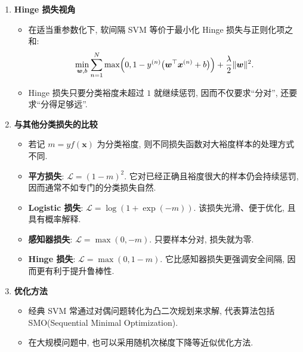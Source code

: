 \documentclass{../nndlcourse}
\begin{document}
\begin{enumerate}
\begin{itemize}
\begin{equation*}
\begin{array}{ll}
                \min_{\boldsymbol{w}, b, \boldsymbol{\xi}} & \frac{1}{2}\|\boldsymbol{w}\|^2 + C \sum_{n=1}^N \xi_n \\
                \text{s.t.} & y^{(n)}\bigl(\boldsymbol{w}^\top \boldsymbol{x}^{(n)} + b\bigr) \ge 1 - \xi_n, \quad n = 1, \dots, N, \\
                & \xi_n \ge 0, \quad n = 1, \dots, N.
            \end{array}
        \end{equation*}
        \item 当 $0 < \xi_n < 1$ 时, 样本虽然仍被分对, 但已经落入间隔内部; 当 $\xi_n \ge 1$ 时, 样本可能被错分.
        \item 超参数 $C > 0$ 用于平衡“最大化间隔”和“惩罚违约”这两个目标: $C$ 越大, 对违约样本惩罚越强; $C$ 越小, 模型越强调间隔和鲁棒性.
    \end{itemize}
    \item \textbf{Hinge 损失视角}
    \begin{itemize}
        \item 在适当重参数化下, 软间隔 SVM 等价于最小化 Hinge 损失与正则化项之和:
        \begin{equation*}
            \min_{\boldsymbol{w}, b} \sum_{n=1}^N \max\Bigl(0, 1 - y^{(n)}\bigl(\boldsymbol{w}^\top \boldsymbol{x}^{(n)} + b\bigr)\Bigr)
            + \frac{\lambda}{2}\|\boldsymbol{w}\|^2.
        \end{equation*}
        \item Hinge 损失只要分类裕度未超过 $1$ 就继续惩罚, 因而不仅要求“分对”, 还要求“分得足够远”.
    \end{itemize}
    \item \textbf{与其他分类损失的比较}
    \begin{itemize}
        \item 若记 $m = y f(\boldsymbol{x})$ 为分类裕度, 则不同损失函数对大裕度样本的处理方式不同.
        \item \textbf{平方损失}: $\mathcal{L} = (1 - m)^2$. 它对已经正确且裕度很大的样本仍会持续惩罚, 因而通常不如专门的分类损失自然.
        \item \textbf{Logistic 损失}: $\mathcal{L} = \log(1 + \exp(-m))$. 该损失光滑、便于优化, 且具有概率解释.
        \item \textbf{感知器损失}: $\mathcal{L} = \max(0, -m)$. 只要样本分对, 损失就为零.
        \item \textbf{Hinge 损失}: $\mathcal{L} = \max(0, 1 - m)$. 它比感知器损失更强调安全间隔, 因而更有利于提升鲁棒性.
    \end{itemize}
    \item \textbf{优化方法}
    \begin{itemize}
        \item 经典 SVM 常通过对偶问题转化为凸二次规划来求解, 代表算法包括 SMO(Sequential Minimal Optimization).
        \item 在大规模问题中, 也可以采用随机次梯度下降等近似优化方法.
    \end{itemize}
\end{enumerate}
\end{document}
